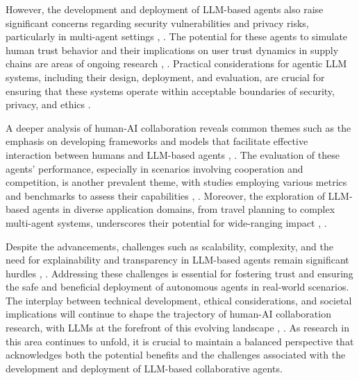\documentclass[conference]{IEEEtran}
\begin{document}
However, the development and deployment of LLM-based agents also raise significant concerns regarding security vulnerabilities and privacy risks, particularly in multi-agent settings \cite{2308.05391}, \cite{2405.16310}. The potential for these agents to simulate human trust behavior and their implications on user trust dynamics in supply chains are areas of ongoing research \cite{2402.04559}, \cite{2405.16310}. Practical considerations for agentic LLM systems, including their design, deployment, and evaluation, are crucial for ensuring that these systems operate within acceptable boundaries of security, privacy, and ethics \cite{2412.04093}.

A deeper analysis of human-AI collaboration reveals common themes such as the emphasis on developing frameworks and models that facilitate effective interaction between humans and LLM-based agents \cite{2308.11432}, \cite{2409.14457}. The evaluation of these agents' performance, especially in scenarios involving cooperation and competition, is another prevalent theme, with studies employing various metrics and benchmarks to assess their capabilities \cite{2411.14033}, \cite{2308.05960}. Moreover, the exploration of LLM-based agents in diverse application domains, from travel planning to complex multi-agent systems, underscores their potential for wide-ranging impact \cite{2411.13904}, \cite{2402.16499}.

Despite the advancements, challenges such as scalability, complexity, and the need for explainability and transparency in LLM-based agents remain significant hurdles \cite{2403.11381}, \cite{2502.01390}. Addressing these challenges is essential for fostering trust and ensuring the safe and beneficial deployment of autonomous agents in real-world scenarios. The interplay between technical development, ethical considerations, and societal implications will continue to shape the trajectory of human-AI collaboration research, with LLMs at the forefront of this evolving landscape \cite{2412.15701}, \cite{2309.07864}. As research in this area continues to unfold, it is crucial to maintain a balanced perspective that acknowledges both the potential benefits and the challenges associated with the development and deployment of LLM-based collaborative agents.
\end{document}
